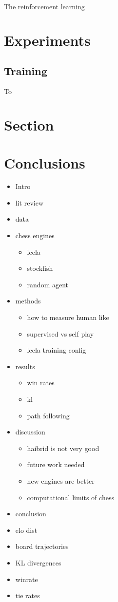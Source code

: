 \documentclass{article}
\begin{document}
The reinforcement learning 


\section{Experiments}

\subsection{Training}

To 


\section{Section}

\section{Conclusions}



\begin{itemize}
	\item Intro
	\item lit review
	\item data
	\item chess engines
	\begin{itemize}
		\item leela
		\item stockfish
		\item random agent
	\end{itemize}
	\item methods
	\begin{itemize}
		\item how to measure human like
		\item supervised vs self play
		\item leela training config
	\end{itemize}
	\item results
	\begin{itemize}
		\item win rates
		\item kl
		\item path following
	\end{itemize}
	\item discussion
	\begin{itemize}
		\item haibrid is not very good
		\item future work needed
		\item new engines are better
		\item computational limits of chess
	\end{itemize}
	\item conclusion
\end{itemize}

\begin{itemize}
	\item elo dist
	\item board trajectories
	\item KL divergences 
	\item winrate
	\item tie rates
\end{itemize}
{}


\end{document}
